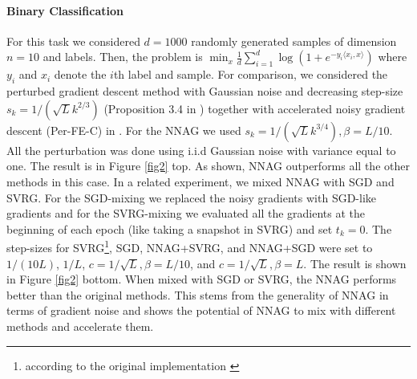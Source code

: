 \documentclass{article}
\theoremstyle{plain}
\theoremstyle{definition}
\theoremstyle{remark}
\begin{document}
\paragraph{Binary Classification}
For this task we considered \(d=1000\) randomly generated samples of dimension \(n=10\) and labels. Then, the problem is \(\min_x \tfrac{1}{d}\sum_{i=1}^d \log(1+e^{-y_i\langle x_i,x \rangle})\) where \(y_i\) and \(x_i\) denote the \(i\)th label and sample. For comparison, we considered the perturbed gradient descent method with Gaussian noise and decreasing step-size \(s_k=1/(\sqrt{L}k^{2/3})\) (Proposition 3.4 in \citep{pmlr-v108-laborde20a}) together with accelerated noisy gradient descent (Per-FE-C) in \citep{pmlr-v108-laborde20a}. For the NNAG we used \(s_k=1/(\sqrt{L}k^{3/4}),\beta=L/10\). All the perturbation was done using i.i.d Gaussian noise with variance equal to one.  The result is in Figure \ref{fig2} top. As shown, NNAG outperforms all the other methods in this case. In a related experiment, we mixed NNAG with SGD and SVRG. For the SGD-mixing we replaced the noisy gradients with SGD-like gradients and for the SVRG-mixing we evaluated all the gradients at the beginning of each epoch (like taking a snapshot in SVRG) and set \(t_k=0\). The step-sizes for SVRG\footnote{according to the original implementation \citep{johnson2013accelerating}}, SGD, NNAG+SVRG, and NNAG+SGD were set to \(1/(10L)\), \(1/L\), \(c=1/\sqrt{L},\beta=L/10\), and \(c=1/\sqrt{L},\beta=L\). The result is shown in Figure \ref{fig2} bottom. When mixed with SGD or SVRG, the NNAG performs better than the original methods. This stems from the generality of NNAG in terms of gradient noise and shows the potential of NNAG to mix with different methods and accelerate them.
\end{document}
